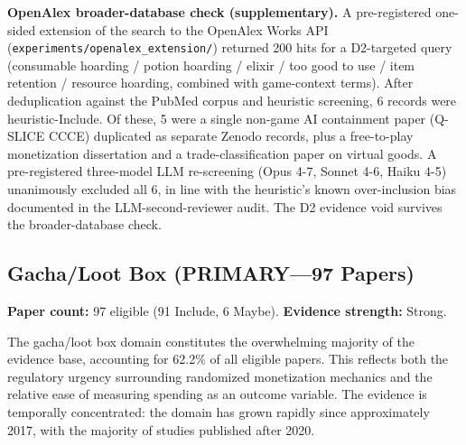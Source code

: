 \documentclass[12pt]{article}
\begin{document}
\textbf{OpenAlex broader-database check (supplementary).} A pre-registered one-sided extension of the search to the OpenAlex Works API (\texttt{experiments/openalex\_extension/}) returned 200 hits for a D2-targeted query (consumable hoarding / potion hoarding / elixir / too good to use / item retention / resource hoarding, combined with game-context terms). After deduplication against the PubMed corpus and heuristic screening, 6 records were heuristic-Include. Of these, 5 were a single non-game AI containment paper (Q-SLICE CCCE) duplicated as separate Zenodo records, plus a free-to-play monetization dissertation and a trade-classification paper on virtual goods. A pre-registered three-model LLM re-screening (Opus 4-7, Sonnet 4-6, Haiku 4-5) unanimously excluded all 6, in line with the heuristic's known over-inclusion bias documented in the LLM-second-reviewer audit. The D2 evidence void survives the broader-database check.

\subsection{Gacha/Loot Box (PRIMARY---97 Papers)}

\textbf{Paper count:} 97 eligible (91 Include, 6 Maybe). \textbf{Evidence strength:} Strong.

The gacha/loot box domain constitutes the overwhelming majority of the evidence base, accounting for 62.2\% of all eligible papers. This reflects both the regulatory urgency surrounding randomized monetization mechanics and the relative ease of measuring spending as an outcome variable. The evidence is temporally concentrated: the domain has grown rapidly since approximately 2017, with the majority of studies published after 2020.
\end{document}
